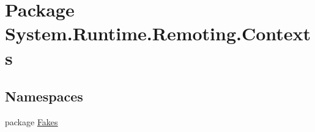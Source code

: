\hypertarget{namespace_system_1_1_runtime_1_1_remoting_1_1_contexts}{\section{Package System.\-Runtime.\-Remoting.\-Contexts}
\label{namespace_system_1_1_runtime_1_1_remoting_1_1_contexts}
}
\subsection*{Namespaces}
\begin{DoxyCompactItemize}
\item 
package \hyperlink{namespace_system_1_1_runtime_1_1_remoting_1_1_contexts_1_1_fakes}{Fakes}
\end{DoxyCompactItemize}
